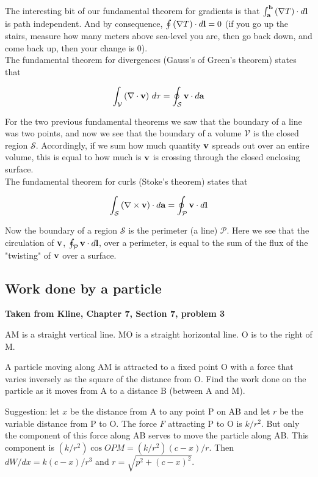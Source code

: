 The interesting bit of our fundamental theorem for gradients is that $\int_{\boldsymbol{\mathbf{a}}}^{\boldsymbol{\mathbf{b}}} \left(\nabla T\right) \cdot d\boldsymbol{\mathbf{l}}$
is path independent.
And by consequence, $\oint \left(\nabla T\right) \cdot d\boldsymbol{\mathbf{l}} = 0$
(if you go up the stairs, measure how many meters above sea-level you are, then go back down, and come back up, then your
change is 0).
\\

The fundamental theorem for divergences (Gauss's of Green's theorem) states that

$$
\int_{\mathcal{V}} \left(\nabla\cdot \boldsymbol{\mathbf{v}}\right) \, d\tau
= \oint_{\mathcal{S}} \boldsymbol{\mathbf{v}}\cdot d\boldsymbol{\mathbf{a}}
$$

For the two previous fundamental theorems we saw that the boundary of a line was two points, and now we see that the boundary
of a volume $\mathcal{V}$ is the closed region $\mathcal{S}$.
Accordingly, if we sum how much quantity $\boldsymbol{\mathbf{v}}$ spreads out over an entire volume, this is equal to how much
is $\boldsymbol{\mathbf{v}}$ is crossing through the closed enclosing surface.
\\

The fundamental theorem for curls (Stoke's theorem) states that

$$
\int_{\mathcal{S}} \left( \nabla\times\boldsymbol{\mathbf{v}} \right) \cdot d\boldsymbol{\mathbf{a}}
= \oint_{\mathcal{P}} \boldsymbol{\mathbf{v}} \cdot d\boldsymbol{\mathbf{l}}
$$

Now the boundary of a region $\mathcal{S}$ is the perimeter (a line) $\mathcal{P}$.
Here we see that the circulation of $\boldsymbol{\mathbf{v}}$, $\oint_{\mathcal{P}} \boldsymbol{\mathbf{v}} \cdot d\boldsymbol{\mathbf{l}}$, over a perimeter,
is equal to the sum of the flux of the "twisting" of $\boldsymbol{\mathbf{v}}$ over a surface.


\subsection{Work done by a particle}

\textbf{Taken from Kline, Chapter 7, Section 7, problem 3}

AM is a straight vertical line.
MO is a straight horizontal line. O is to the right of M.

A particle moving along AM is attracted to a fixed point O with a force that varies inversely
as the square of the distance from O.
Find the work done on the particle as it moves from A to a distance B (between A and M).

Suggestion: let $x$ be the distance from A to any point P on AB
and let $r$ be the variable distance from P to O.
The force $F$ attracting P to O is $k/r^2$.
But only the component of this force along AB serves to move the particle along AB.
This component is $(k/r^2) \cos OPM = (k/r^2) (c-x)/r$.
Then $dW/dx = k (c-x)/r^3$ and $r = \sqrt{p^2 + (c-x)^2}$.
\\

